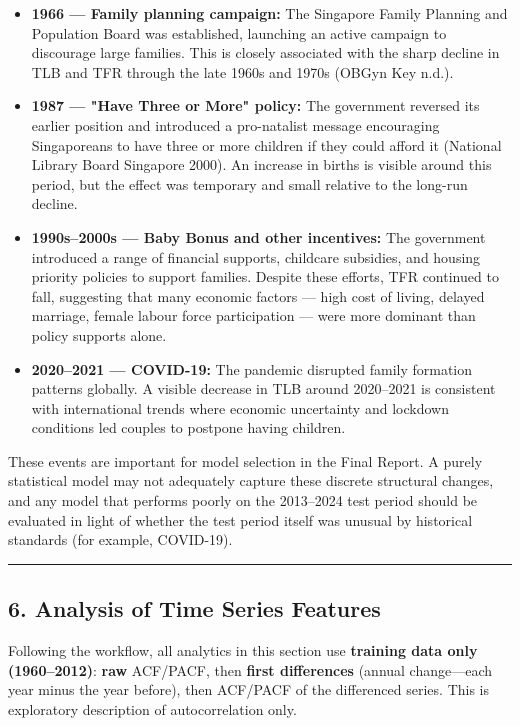 \documentclass[
]{article}
\providecommand{\tightlist}{%
  \setlength{\itemsep}{0pt}\setlength{\parskip}{0pt}}
\begin{document}
\begin{itemize}
\tightlist
\item
  \textbf{1966 --- Family planning campaign:} The Singapore Family
  Planning and Population Board was established, launching an active
  campaign to discourage large families. This is closely associated with
  the sharp decline in TLB and TFR through the late 1960s and 1970s
  (OBGyn Key n.d.).
\item
  \textbf{1987 --- "Have Three or More" policy:} The government reversed
  its earlier position and introduced a pro-natalist message encouraging
  Singaporeans to have three or more children if they could afford it
  (National Library Board Singapore 2000). An increase in births is
  visible around this period, but the effect was temporary and small
  relative to the long-run decline.
\item
  \textbf{1990s--2000s --- Baby Bonus and other incentives:} The
  government introduced a range of financial supports, childcare
  subsidies, and housing priority policies to support families. Despite
  these efforts, TFR continued to fall, suggesting that many economic
  factors --- high cost of living, delayed marriage, female labour force
  participation --- were more dominant than policy supports alone.
\item
  \textbf{2020--2021 --- COVID-19:} The pandemic disrupted family
  formation patterns globally. A visible decrease in TLB around
  2020--2021 is consistent with international trends where economic
  uncertainty and lockdown conditions led couples to postpone having
  children.
\end{itemize}

These events are important for model selection in the Final Report. A
purely statistical model may not adequately capture these discrete
structural changes, and any model that performs poorly on the 2013--2024
test period should be evaluated in light of whether the test period
itself was unusual by historical standards (for example, COVID-19).

\begin{center}\rule{0.5\linewidth}{0.5pt}\end{center}

\subsection{6. Analysis of Time Series
Features}\label{analysis-of-time-series-features}

Following the workflow, all analytics in this section use
\textbf{training data only (1960--2012)}: \textbf{raw} ACF/PACF, then
\textbf{first differences} (annual change---each year minus the year
before), then ACF/PACF of the differenced series. This is exploratory
description of autocorrelation only.
\end{document}
